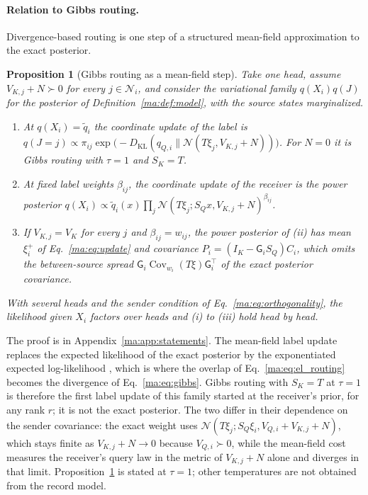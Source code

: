 \documentclass[11pt]{article}
\newtheorem{proposition}[theorem]{Proposition}
\theoremstyle{definition}
\theoremstyle{remark}
\providecommand{\KL}{D_{\mathrm{KL}}}
\newcommand{\Nset}{\mathcal N}
\newcommand{\Gauss}{\mathcal N}
\newcommand{\G}{\mathsf G}
\newcommand{\qt}{\widetilde q}
\newcommand{\Cov}{\operatorname{Cov}}
\begin{document}
\paragraph{Relation to Gibbs routing.}
Divergence-based routing is one step of a structured mean-field approximation to the exact posterior.

\begin{proposition}[Gibbs routing as a mean-field step]
\label{ma:prop:mean_field}
Take one head, assume $V_{K,j}+N\succ0$ for every $j\in\Nset_i$, and consider the variational family $q(X_i)q(J)$ for the posterior of Definition~\ref{ma:def:model}, with the source states marginalized.
\begin{enumerate}
\item[(i)] At $q(X_i)=\qt_i$ the coordinate update of the label is $q(J=j)\propto\pi_{ij}\exp\bigl(-\KL(q_{Q,i}\|\Gauss(T\xi_j,V_{K,j}+N))\bigr)$. For $N=0$ it is Gibbs routing with $\tau=1$ and $S_K=T$.
\item[(ii)] At fixed label weights $\beta_{ij}$, the coordinate update of the receiver is the power posterior $q(X_i)\propto\qt_i(x)\prod_j\Gauss(T\xi_j;S_Qx,V_{K,j}+N)^{\beta_{ij}}$.
\item[(iii)] If $V_{K,j}=V_K$ for every $j$ and $\beta_{ij}=w_{ij}$, the power posterior of (ii) has mean $\xi_i^+$ of Eq.~\eqref{ma:eq:update} and covariance $P_i=(I_K-\G_iS_Q)C_i$, which omits the between-source spread $\G_i\Cov_{w_i}(T\xi)\G_i^\top$ of the exact posterior covariance.
\end{enumerate}
With several heads and the sender condition of Eq.~\eqref{ma:eq:orthogonality}, the likelihood given $X_i$ factors over heads and (i) to (iii) hold head by head.
\end{proposition}

The proof is in Appendix~\ref{ma:app:statements}. The mean-field label update replaces the expected likelihood of the exact posterior by the exponentiated expected log-likelihood \citep[Sec.~10.1]{Bishop2006}, which is where the overlap of Eq.~\eqref{ma:eq:el_routing} becomes the divergence of Eq.~\eqref{ma:eq:gibbs}. Gibbs routing with $S_K=T$ at $\tau=1$ is therefore the first label update of this family started at the receiver's prior, for any rank $r$; it is not the exact posterior. The two differ in their dependence on the sender covariance: the exact weight uses $\Gauss(T\xi_j;S_Q\xi_i,V_{Q,i}+V_{K,j}+N)$, which stays finite as $V_{K,j}+N\to0$ because $V_{Q,i}\succ0$, while the mean-field cost measures the receiver's query law in the metric of $V_{K,j}+N$ alone and diverges in that limit. Proposition~\ref{ma:prop:mean_field} is stated at $\tau=1$; other temperatures are not obtained from the record model.
\end{document}
